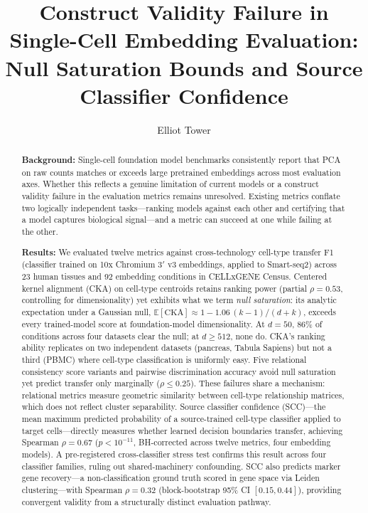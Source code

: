 \documentclass[11pt]{article}
\title{Construct Validity Failure in Single-Cell Embedding Evaluation:\\
Null Saturation Bounds and Source Classifier Confidence}
\author{Elliot Tower}
\affil{Independent researcher \\ \texttt{elliot@elliottower.ai}}
\date{}
\begin{document}
\linenumbers
\maketitle

\begin{abstract}

\textbf{Background:}
Single-cell foundation model benchmarks consistently report that PCA
on raw counts matches or exceeds large pretrained embeddings across
most evaluation axes. Whether this reflects a genuine limitation of
current models or a construct validity failure in the evaluation
metrics remains unresolved. Existing metrics conflate two logically
independent tasks---ranking models against each other and certifying
that a model captures biological signal---and a metric can succeed at
one while failing at the other.

\textbf{Results:}
We evaluated twelve metrics against cross-technology cell-type
transfer F1 (classifier trained on 10x Chromium 3$'$ v3 embeddings,
applied to Smart-seq2) across 23 human tissues and 92 embedding
conditions in CELLxGENE Census. Centered kernel alignment (CKA) on
cell-type centroids retains ranking power (partial $\rho = 0.53$,
controlling for dimensionality) yet exhibits what we term \emph{null saturation}:
its analytic expectation under a Gaussian null,
$\mathbb{E}[\mathrm{CKA}] \approx 1 - 1.06\,(k{-}1)/(d{+}k)$,
exceeds every trained-model score at foundation-model dimensionality.
At $d = 50$, 86\% of conditions across four datasets clear the null;
at $d \geq 512$, none do. CKA's ranking ability replicates on two
independent datasets (pancreas, Tabula Sapiens) but not a third
(PBMC) where cell-type classification is uniformly easy. Five
relational consistency score variants and pairwise discrimination
accuracy avoid null saturation yet predict transfer only marginally
($\rho \leq 0.25$). These failures share a mechanism: relational
metrics measure geometric similarity between cell-type relationship
matrices, which does not reflect cluster separability. Source
classifier confidence (SCC)---the mean maximum predicted probability
of a source-trained cell-type classifier applied to target
cells---directly measures whether learned decision boundaries
transfer, achieving Spearman $\rho = 0.67$ ($p < 10^{-11}$,
BH-corrected across twelve metrics, four embedding models). A
pre-registered cross-classifier stress test confirms this result
across four classifier families, ruling out shared-machinery
confounding. SCC also predicts marker gene recovery---a
non-classification ground truth scored in gene space via Leiden
clustering---with Spearman $\rho = 0.32$ (block-bootstrap 95\% CI
$[0.15, 0.44]$), providing convergent validity from a structurally
distinct evaluation pathway.


\end{abstract}
\end{document}
